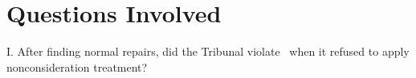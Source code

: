 \documentclass[12pt,\documentclassflag]{michiganCourtOfAppealsBrief}
\begin{document}








\newpage 
\section{Questions Involved} 

\noindent I. After finding normal repairs, did the Tribunal violate \mathieuGast\ when it refused to apply nonconsideration treatment?
\end{document}
